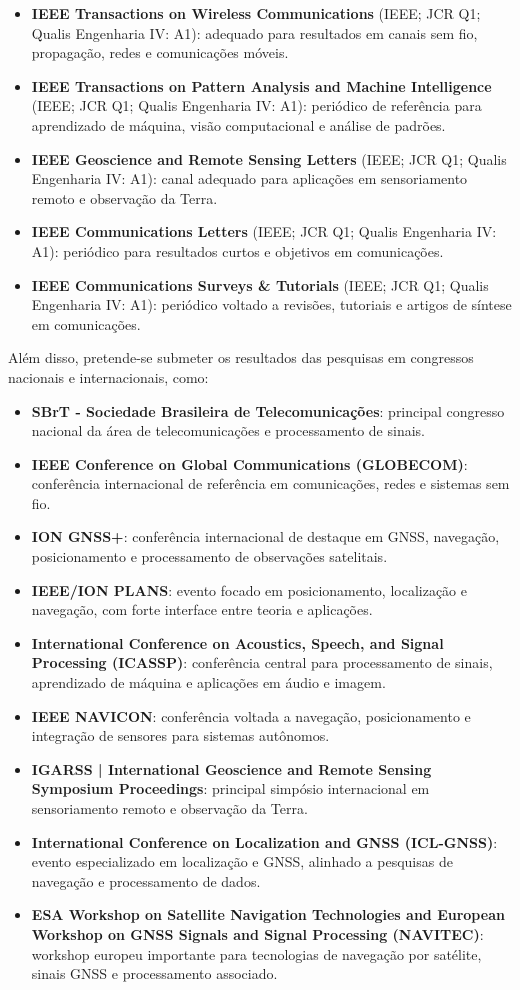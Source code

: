 \documentclass{article}
\begin{document}
\begin{itemize}
  \item \textbf{IEEE Transactions on Wireless Communications} (IEEE; JCR Q1; Qualis Engenharia IV: A1): adequado para resultados em canais sem fio, propagação, redes e comunicações móveis.
  \item \textbf{IEEE Transactions on Pattern Analysis and Machine Intelligence} (IEEE; JCR Q1; Qualis Engenharia IV: A1): periódico de referência para aprendizado de máquina, visão computacional e análise de padrões.
  \item \textbf{IEEE Geoscience and Remote Sensing Letters} (IEEE; JCR Q1; Qualis Engenharia IV: A1): canal adequado para aplicações em sensoriamento remoto e observação da Terra.
  \item \textbf{IEEE Communications Letters} (IEEE; JCR Q1; Qualis Engenharia IV: A1): periódico para resultados curtos e objetivos em comunicações.
  \item \textbf{IEEE Communications Surveys \& Tutorials} (IEEE; JCR Q1; Qualis Engenharia IV: A1): periódico voltado a revisões, tutoriais e artigos de síntese em comunicações.
\end{itemize}

Além disso, pretende-se submeter os resultados das pesquisas em congressos nacionais e internacionais, como:
\begin{itemize}
  \item \textbf{SBrT - Sociedade Brasileira de Telecomunicações}: principal congresso nacional da área de telecomunicações e processamento de sinais.
  \item \textbf{IEEE Conference on Global Communications (GLOBECOM)}: conferência internacional de referência em comunicações, redes e sistemas sem fio.
  \item \textbf{ION GNSS+}: conferência internacional de destaque em GNSS, navegação, posicionamento e processamento de observações satelitais.
  \item \textbf{IEEE/ION PLANS}: evento focado em posicionamento, localização e navegação, com forte interface entre teoria e aplicações.
  \item \textbf{International Conference on Acoustics, Speech, and Signal Processing (ICASSP)}: conferência central para processamento de sinais, aprendizado de máquina e aplicações em áudio e imagem.
  \item \textbf{IEEE NAVICON}: conferência voltada a navegação, posicionamento e integração de sensores para sistemas autônomos.
  \item \textbf{IGARSS | International Geoscience and Remote Sensing Symposium Proceedings}: principal simpósio internacional em sensoriamento remoto e observação da Terra.
  \item \textbf{International Conference on Localization and GNSS (ICL-GNSS)}: evento especializado em localização e GNSS, alinhado a pesquisas de navegação e processamento de dados.
  \item \textbf{ESA Workshop on Satellite Navigation Technologies and European Workshop on GNSS Signals and Signal Processing (NAVITEC)}: workshop europeu importante para tecnologias de navegação por satélite, sinais GNSS e processamento associado.
\end{itemize}
\end{document}
